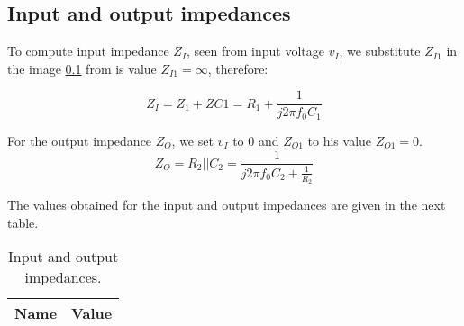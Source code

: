  \subsection{Input and output impedances}
 \par To compute input impedance $Z_I$, seen from input voltage $v_I$, we substitute $Z_{I1}$ in the image \ref{} from is value $Z_{I1}=\infty$, therefore:
 
 \begin{equation}
 Z_I=Z_1+Z{C1}=R_1+\frac{1}{j2\pi f_0C_1}
 \end{equation}
\par For the output impedance $Z_{O}$, we set $v_I$ to $0$ and $Z_{O1}$ to his value $Z_{O1}=0$.
\begin{equation}
Z_O=R_2||C_2=\frac{1}{j2\pi f_0C_2+\frac{1}{R_2}}
\end{equation}

\par The values obtained for the input and output impedances are given in the next table.

\begin{table}[H]
    \centering
    \begin{tabular}{|l|r|}
    \hline    
    {\bf Name} & {\bf Value} \\ \hline
    
    \end{tabular}
     \caption{Input and output impedances.}
    \label{tab:freq}
  \end{table}



  
 


 
 
